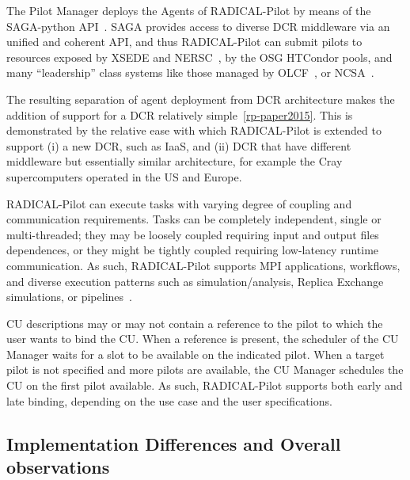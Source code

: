 \documentclass{sig-alternate}
\begin{document}
The Pilot Manager deploys the Agents of RADICAL-Pilot by means of the
SAGA-python API~\cite{sagax}. SAGA provides access to diverse DCR middleware via
an unified and coherent API, and thus RADICAL-Pilot can submit pilots to
resources exposed by XSEDE and NERSC~\cite{nersc_url}, by the OSG HTCondor
pools, and many ``leadership'' class systems like those managed by
OLCF~\cite{olcf_url}, or NCSA~\cite{ncsa_url}.

The resulting separation of agent deployment from DCR architecture makes the
addition of support for a DCR relatively simple~\ref{rp-paper2015}. This is
demonstrated by the relative ease with which RADICAL-Pilot is extended to
support (i) a new DCR, such as IaaS, and (ii) DCR that have different middleware
but essentially similar architecture, for example the Cray supercomputers
operated in the US and Europe.

RADICAL-Pilot can execute tasks with varying degree of coupling and
communication requirements. Tasks can be completely independent, single or
multi-threaded; they may be loosely coupled requiring input and output files
dependences, or they might be tightly coupled requiring low-latency runtime
communication. As such, RADICAL-Pilot supports MPI applications, workflows, and
diverse execution patterns such as simulation/analysis, Replica Exchange
simulations, or pipelines~\cite{emdtoolkit_url}.

CU descriptions may or may not contain a reference to the pilot to which the
user wants to bind the CU. When a reference is present, the scheduler of the CU
Manager waits for a slot to be available on the indicated pilot. When a target
pilot is not specified and more pilots are available, the CU Manager schedules
the CU on the first pilot available. As such, RADICAL-Pilot supports both early
and late binding, depending on the use case and the user specifications.

%
\subsection{Implementation Differences and Overall observations}
\label{sec:context}

\end{document}
